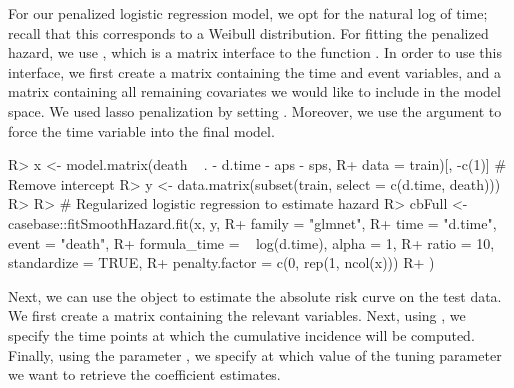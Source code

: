 \documentclass[
]{jss}
\begin{document}
For our penalized logistic regression model, we opt for the natural log
of time; recall that this corresponds to a Weibull distribution. For
fitting the penalized hazard, we use , which
is a matrix interface to the function . In order
to use this interface, we first create a matrix  containing the
time and event variables, and a matrix  containing all remaining
covariates we would like to include in the model space. We used lasso
penalization by setting . Moreover, we use the argument
 to force the time variable into the final model.

\begin{CodeChunk}

\begin{CodeInput}
R> x <- model.matrix(death ~ . - d.time - aps - sps, 
R+                   data = train)[, -c(1)] # Remove intercept
R> y <- data.matrix(subset(train, select = c(d.time, death)))
R> 
R> # Regularized logistic regression to estimate hazard
R> cbFull <- casebase::fitSmoothHazard.fit(x, y,
R+   family = "glmnet",
R+   time = "d.time", event = "death",
R+   formula_time = ~ log(d.time), alpha = 1,
R+   ratio = 10, standardize = TRUE,
R+   penalty.factor = c(0, rep(1, ncol(x)))
R+ )
\end{CodeInput}
\end{CodeChunk}

Next, we can use the object  to estimate the absolute risk
curve on the test data. We first create a matrix  containing
the relevant variables. Next, using , we specify the time
points at which the cumulative incidence will be computed. Finally,
using the parameter , we specify at which value
of the tuning parameter we want to retrieve the coefficient estimates.

\begin{CodeChunk}

\end{CodeChunk}
\end{document}
